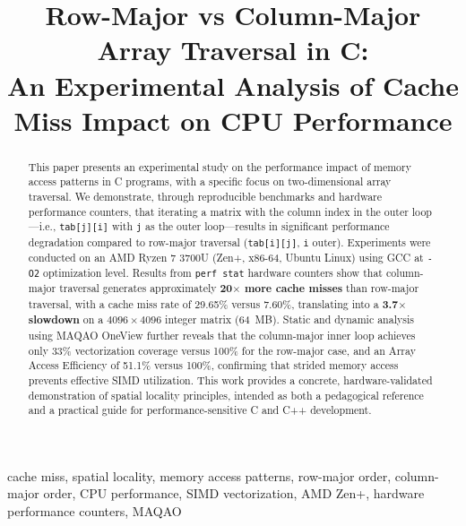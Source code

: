 \documentclass[conference]{IEEEtran}
\begin{document}
\title{Row-Major vs Column-Major Array Traversal in C:\\
An Experimental Analysis of Cache Miss Impact on CPU Performance}

\author{
}

\maketitle

\begin{abstract}
This paper presents an experimental study on the performance impact of memory
access patterns in C programs, with a specific focus on two-dimensional array
traversal. We demonstrate, through reproducible benchmarks and hardware
performance counters, that iterating a matrix with the column index in the outer
loop---i.e., \texttt{tab[j][i]} with \texttt{j} as the outer loop---results in
significant performance degradation compared to row-major traversal
(\texttt{tab[i][j]}, \texttt{i} outer). Experiments were conducted on an AMD
Ryzen 7 3700U (Zen+, x86-64, Ubuntu Linux) using GCC at \texttt{-O2}
optimization level. Results from \texttt{perf stat} hardware counters show that
column-major traversal generates approximately \textbf{20$\times$ more cache
misses} than row-major traversal, with a cache miss rate of 29.65\% versus
7.60\%, translating into a \textbf{3.7$\times$ slowdown} on a $4096 \times
4096$ integer matrix (64~MB). Static and dynamic analysis using MAQAO OneView
further reveals that the column-major inner loop achieves only 33\%
vectorization coverage versus 100\% for the row-major case, and an Array Access
Efficiency of 51.1\% versus 100\%, confirming that strided memory access
prevents effective SIMD utilization. This work provides a concrete,
hardware-validated demonstration of spatial locality principles, intended as
both a pedagogical reference and a practical guide for performance-sensitive
C and C++ development.
\end{abstract}

\begin{IEEEkeywords}
cache miss, spatial locality, memory access patterns, row-major order,
column-major order, CPU performance, SIMD vectorization, AMD Zen+,
hardware performance counters, MAQAO
\end{IEEEkeywords}
\end{document}
